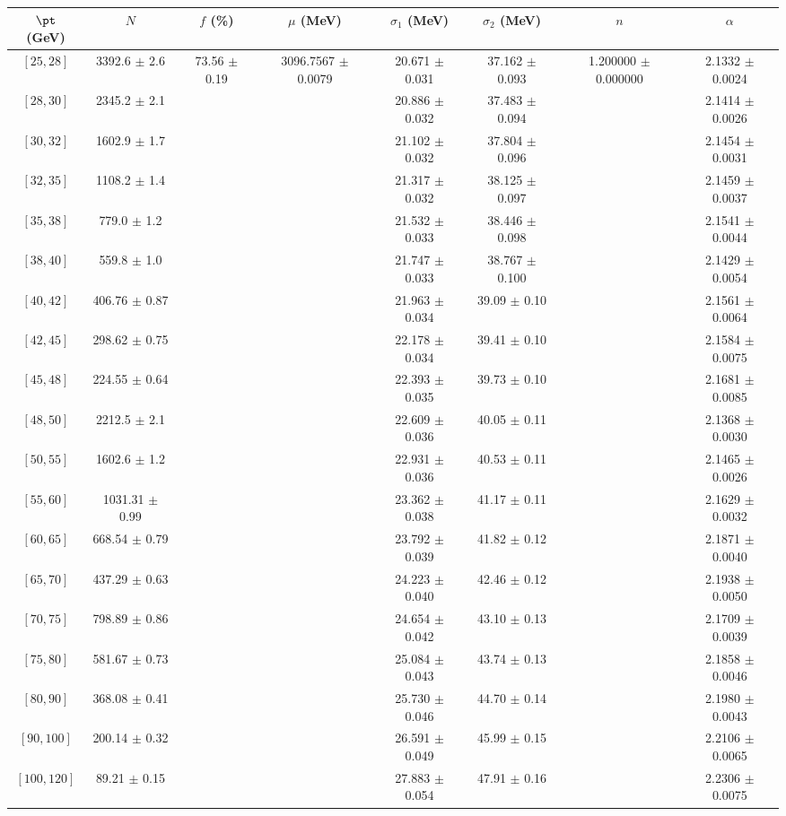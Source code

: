 \begin{tabular}{c||c|c|c|c|c|c|c}
$\pt$ (GeV) & $N$ & $f$ (\%) & $\mu$ (MeV) & $\sigma_1$ (MeV) & $\sigma_2$ (MeV) & $n$ & $\alpha$ \\
\hline
$[25, 28]$ & 3392.6 $\pm$ 2.6 & \multirow{19}{*}{73.56 $\pm$ 0.19} & \multirow{19}{*}{3096.7567 $\pm$ 0.0079} & 20.671 $\pm$ 0.031 & 37.162 $\pm$ 0.093 & \multirow{19}{*}{1.200000 $\pm$ 0.000000} & 2.1332 $\pm$ 0.0024\\
$[28, 30]$ & 2345.2 $\pm$ 2.1 &  &  & 20.886 $\pm$ 0.032 & 37.483 $\pm$ 0.094 &  & 2.1414 $\pm$ 0.0026\\
$[30, 32]$ & 1602.9 $\pm$ 1.7 &  &  & 21.102 $\pm$ 0.032 & 37.804 $\pm$ 0.096 &  & 2.1454 $\pm$ 0.0031\\
$[32, 35]$ & 1108.2 $\pm$ 1.4 &  &  & 21.317 $\pm$ 0.032 & 38.125 $\pm$ 0.097 &  & 2.1459 $\pm$ 0.0037\\
$[35, 38]$ & 779.0 $\pm$ 1.2 &  &  & 21.532 $\pm$ 0.033 & 38.446 $\pm$ 0.098 &  & 2.1541 $\pm$ 0.0044\\
$[38, 40]$ & 559.8 $\pm$ 1.0 &  &  & 21.747 $\pm$ 0.033 & 38.767 $\pm$ 0.100 &  & 2.1429 $\pm$ 0.0054\\
$[40, 42]$ & 406.76 $\pm$ 0.87 &  &  & 21.963 $\pm$ 0.034 & 39.09 $\pm$ 0.10 &  & 2.1561 $\pm$ 0.0064\\
$[42, 45]$ & 298.62 $\pm$ 0.75 &  &  & 22.178 $\pm$ 0.034 & 39.41 $\pm$ 0.10 &  & 2.1584 $\pm$ 0.0075\\
$[45, 48]$ & 224.55 $\pm$ 0.64 &  &  & 22.393 $\pm$ 0.035 & 39.73 $\pm$ 0.10 &  & 2.1681 $\pm$ 0.0085\\
$[48, 50]$ & 2212.5 $\pm$ 2.1 &  &  & 22.609 $\pm$ 0.036 & 40.05 $\pm$ 0.11 &  & 2.1368 $\pm$ 0.0030\\
$[50, 55]$ & 1602.6 $\pm$ 1.2 &  &  & 22.931 $\pm$ 0.036 & 40.53 $\pm$ 0.11 &  & 2.1465 $\pm$ 0.0026\\
$[55, 60]$ & 1031.31 $\pm$ 0.99 &  &  & 23.362 $\pm$ 0.038 & 41.17 $\pm$ 0.11 &  & 2.1629 $\pm$ 0.0032\\
$[60, 65]$ & 668.54 $\pm$ 0.79 &  &  & 23.792 $\pm$ 0.039 & 41.82 $\pm$ 0.12 &  & 2.1871 $\pm$ 0.0040\\
$[65, 70]$ & 437.29 $\pm$ 0.63 &  &  & 24.223 $\pm$ 0.040 & 42.46 $\pm$ 0.12 &  & 2.1938 $\pm$ 0.0050\\
$[70, 75]$ & 798.89 $\pm$ 0.86 &  &  & 24.654 $\pm$ 0.042 & 43.10 $\pm$ 0.13 &  & 2.1709 $\pm$ 0.0039\\
$[75, 80]$ & 581.67 $\pm$ 0.73 &  &  & 25.084 $\pm$ 0.043 & 43.74 $\pm$ 0.13 &  & 2.1858 $\pm$ 0.0046\\
$[80, 90]$ & 368.08 $\pm$ 0.41 &  &  & 25.730 $\pm$ 0.046 & 44.70 $\pm$ 0.14 &  & 2.1980 $\pm$ 0.0043\\
$[90, 100]$ & 200.14 $\pm$ 0.32 &  &  & 26.591 $\pm$ 0.049 & 45.99 $\pm$ 0.15 &  & 2.2106 $\pm$ 0.0065\\
$[100, 120]$ & 89.21 $\pm$ 0.15 &  &  & 27.883 $\pm$ 0.054 & 47.91 $\pm$ 0.16 &  & 2.2306 $\pm$ 0.0075\\
\end{tabular}

